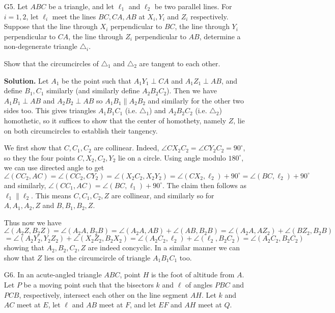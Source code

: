\documentclass[11pt,a4paper]{article}
\begin{document}
\begin{enumerate}
    	\item [G5.]
    	Let $ABC$ be a triangle, and let $\ell_1$ and $\ell_2$ be two parallel lines. 
    	For $i = 1,2$, let $\ell_i$ meet the lines $BC, CA, AB$ at $X_i, Y_i$ and $Z_i$ respectively. 
    	Suppose that the line through $X_i$ perpendicular to $BC$, 
    	the line through $Y_i$ perpendicular to $CA$, the line through $Z_i$ perpendicular to $AB$, 
    	determine a non-degenerate triangle $\triangle_i$. 
    	
    	Show that the circumcircles of $\triangle_1$ and $\triangle_2$ are tangent to each other.
    	
    	\textbf{Solution.} Let $A_1$ be the point such that $A_1Y_1\perp CA$ and $A_1Z_1\perp AB$, 
    	and define $B_1, C_1$ similarly (and similarly define $A_2B_2C_2$). 
    	Then we have $A_1B_1\perp AB$ and $A_2B_2\perp AB$ so $A_1B_1\parallel A_2B_2$ and similarly for the other two sides too. 
    	This gives triangles $A_1B_1C_1$ (i.e. $\triangle_1$) and $A_2B_2C_2$ (i.e. $\triangle_2$) homothetic, 
    	so it suffices to show that the center of homothety, namely $Z$, lie on both circumcircles to establish their tangency. 
    	
    	We first show that $C, C_1, C_2$ are collinear. 
    	Indeed, $\angle CX_2C_2 = \angle CY_2C_2 = 90^{\circ}$, 
    	so they the four points $C, X_2, C_2, Y_2$ lie on a circle. 
    	Using angle modulo $180^{\circ}$, we can use directed angle to get 
    	\[
    	\angle(CC_2, AC) = \angle(CC_2, CY_2) = \angle(X_2C_2, X_2Y_2) = \angle(CX_2, \ell_2) + 90^{\circ}
    	=\angle(BC, \ell_2) + 90^{\circ}
    	\]
    	and similarly, 
    	$\angle(CC_1, AC) = \angle(BC, \ell_1) + 90^{\circ}$. The claim then follows as $\ell_1\parallel \ell_2$. 
    	This means $C, C_1, C_2, Z$ are collinear, and similarly so for $A, A_1, A_2, Z$ and $B, B_1, B_2, Z$. 
    	
    	Thus now we have 
    	\[
    	\angle(A_2Z, B_2Z)
    	=\angle(A_2A, B_2B)
    	=\angle(A_2A, AB) + \angle(AB, B_2B)
    	=\angle(A_2A, AZ_2) + \angle(BZ_2, B_2B)
    	\]\[
    	=\angle(A_2Y_2, Y_2Z_2) + \angle(X_2Z_2, B_2X_2)
    	=\angle(A_2C_2, \ell_2) + \angle(\ell_2, B_2C_2)
    	=\angle(A_2C_2, B_2C_2)
    	\]
    	showing that $A_2, B_2, C_2, Z$ are indeed concyclic. In a similar manner we can show that $Z$ lies on the circumcircle of triangle $A_1B_1C_1$ too. 
    	
    	\item [G6.]
    	In an acute-angled triangle $ABC$, 
    	point $H$ is the foot of altitude from $A$. 
    	Let $P$ be a moving point such that the bisectors $k$ and $\ell$ of angles $PBC$ and $PCB$, respectively, 
    	intersect each other on the line segment $AH$. Let $k$ and $AC$ meet at $E$, let $\ell$ and $AB$ meet at $F$, 
    	and let $EF$ and $AH$ meet at $Q$.
    	

\end{enumerate}
\end{document}
